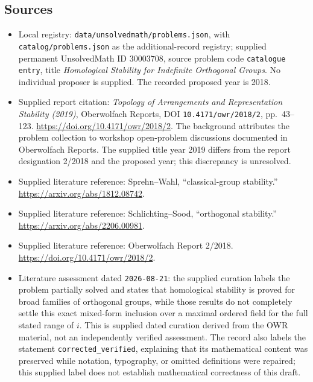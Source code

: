 \documentclass[11pt]{article}
\begin{document}
\subsection{Sources}
\begin{itemize}
\item Local registry: \texttt{data/unsolvedmath/problems.json}, with \texttt{catalog/problems.json} as the additional-record registry; supplied permanent UnsolvedMath ID \(30003708\), source problem code \texttt{catalogue entry}, title \emph{Homological Stability for Indefinite Orthogonal Groups}. No individual proposer is supplied. The recorded proposed year is 2018.
\item Supplied report citation: \emph{Topology of Arrangements and Representation Stability (2019)}, Oberwolfach Reports, DOI \texttt{10.4171/owr/2018/2}, pp.\ 43--123. \url{https://doi.org/10.4171/owr/2018/2}. The background attributes the problem collection to workshop open-problem discussions documented in Oberwolfach Reports. The supplied title year 2019 differs from the report designation 2/2018 and the proposed year; this discrepancy is unresolved.
\item Supplied literature reference: Sprehn--Wahl, ``classical-group stability.'' \url{https://arxiv.org/abs/1812.08742}.
\item Supplied literature reference: Schlichting--Sood, ``orthogonal stability.'' \url{https://arxiv.org/abs/2206.00981}.
\item Supplied literature reference: Oberwolfach Report 2/2018. \url{https://doi.org/10.4171/owr/2018/2}.
\item Literature assessment dated \texttt{2026-08-21}: the supplied curation labels the problem partially solved and states that homological stability is proved for broad families of orthogonal groups, while those results do not completely settle this exact mixed-form inclusion over a maximal ordered field for the full stated range of \(i\). This is supplied dated curation derived from the OWR material, not an independently verified assessment. The record also labels the statement \texttt{corrected\_verified}, explaining that its mathematical content was preserved while notation, typography, or omitted definitions were repaired; this supplied label does not establish mathematical correctness of this draft.
\end{itemize}
\end{document}
